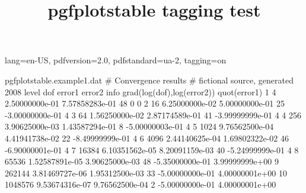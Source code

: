 \DocumentMetadata
  {
    lang=en-US,
    pdfversion=2.0,
    pdfstandard=ua-2,
    tagging=on
  }
\begin{filecontents*}{pgfplotstable.example1.dat}
# Convergence results
# fictional source, generated 2008
level dof error1 error2 info grad(log(dof),log(error2)) quot(error1)
1 4 2.50000000e-01 7.57858283e-01 48 0 0
2 16 6.25000000e-02 5.00000000e-01 25 -3.00000000e-01 4
3 64 1.56250000e-02 2.87174589e-01 41 -3.99999999e-01 4
4 256 3.90625000e-03 1.43587294e-01 8 -5.00000003e-01 4
5 1024 9.76562500e-04 4.41941738e-02 22 -8.49999999e-01 4
6 4096 2.44140625e-04 1.69802322e-02 46 -6.90000001e-01 4
7 16384 6.10351562e-05 8.20091159e-03 40 -5.24999999e-01 4
8 65536 1.52587891e-05 3.90625000e-03 48 -5.35000000e-01 3.99999999e+00
9 262144 3.81469727e-06 1.95312500e-03 33 -5.00000000e-01 4.00000001e+00
10 1048576 9.53674316e-07 9.76562500e-04 2 -5.00000000e-01 4.00000001e+00
\end{filecontents*}

\documentclass{article}
\usepackage{pgfplotstable,booktabs}
\pgfplotsset{compat=newest}
\ifdefined\Uchar\usepackage{lua-unicode-math}\fi

\title{pgfplotstable tagging test}




\bigskip



